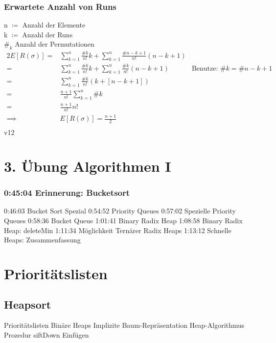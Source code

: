 \documentclass[a4paper]{scrartcl}
\begin{document}
			\subsubsection{Erwartete Anzahl von Runs}
			n \( \coloneqq \) Anzahl der Elemente\\
			k \(\coloneqq\) Anzahl der Runs\\
			\( \#_k  \) Anzahl der Permutationen\\
			\begin{align*}
				2 E[R(\sigma)] =& \sum_{k=1}^{n} \frac{\#k}{n!}k + \sum_{k=1}^{n} \frac{\#n-k+1}{n!} (n - k + 1)\\
				=& \sum_{k=1}^{n} \frac{\#k}{n!}k + \sum_{k=1}^{n} \frac{\#k}{n!} (n - k + 1) & \text{Benutze: } \#k = \#n-k+1 \\
				=& \sum_{k=1}^{n} \frac{\#k}{n!}(k + [n - k + 1]) \\
				=& \frac{n + 1}{n!} \sum_{k=1}^{n} \#k \\
				=& \frac{n + 1}{n!} n!\\
				\implies & E[R(\sigma)] = \frac{n+1}{2}\\
			\end{align*}	
		v12	
	
	\section{3. Übung Algorithmen I} 
			\subsubsection{0:45:04 Erinnerung: Bucketsort} 
			0:46:03 Bucket Sort Spezial 
			0:54:52 Priority Queues 
			0:57:02 Spezielle Priority Queues 
			0:58:36 Bucket Queue 
			1:01:41 Binary Radix Heap 
			1:08:58 Binary Radix Heap: deleteMin 
			1:11:34 Möglichkeit Ternärer Radix Heaps 
			1:13:12 Schnelle Heaps: Zusammenfassung
			
			
		
	\section[Immer die Übersicht behalten]{Prioritätslisten}
		\subsection{Heapsort}
		Prioritätslisten 
		Binäre Heaps 
		Implizite Baum-Repräsentation
		Heap-Algorithmus 
		Prozedur siftDown
		Einfügen 
		
\end{document}

